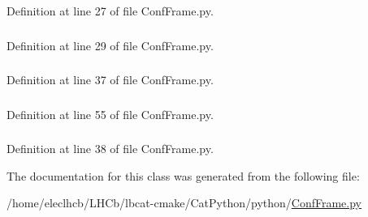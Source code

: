Definition at line 27 of file ConfFrame.py.\hypertarget{classConfFrame_1_1ConfFrame_acf6ff455c1b319bdf5ad72c2da9fd0ff}{
\subsubsection[{path}]{}}
\label{classConfFrame_1_1ConfFrame_acf6ff455c1b319bdf5ad72c2da9fd0ff}


Definition at line 29 of file ConfFrame.py.\hypertarget{classConfFrame_1_1ConfFrame_a595e643a3677b3933db70cd6edfae13b}{
\subsubsection[{paths}]{}}
\label{classConfFrame_1_1ConfFrame_a595e643a3677b3933db70cd6edfae13b}


Definition at line 37 of file ConfFrame.py.\hypertarget{classConfFrame_1_1ConfFrame_adc90838e1e9a307a00ebb9ae9430a113}{
\subsubsection[{toolBar}]{}}
\label{classConfFrame_1_1ConfFrame_adc90838e1e9a307a00ebb9ae9430a113}


Definition at line 55 of file ConfFrame.py.\hypertarget{classConfFrame_1_1ConfFrame_a17eb948c7eb554beca8a712f3e335e0f}{
\subsubsection[{wraps}]{}}
\label{classConfFrame_1_1ConfFrame_a17eb948c7eb554beca8a712f3e335e0f}


Definition at line 38 of file ConfFrame.py.

The documentation for this class was generated from the following file:\begin{DoxyCompactItemize}
\item 
/home/eleclhcb/LHCb/lbcat-\/cmake/CatPython/python/\hyperlink{ConfFrame_8py}{ConfFrame.py}\end{DoxyCompactItemize}

